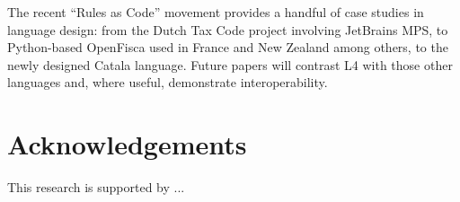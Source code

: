 \documentclass{IOS-Book-Article}
\begin{document}
The recent ``Rules as Code'' movement provides a handful of case studies in language design: from the Dutch Tax Code project involving JetBrains MPS, to Python-based OpenFisca used in France and New Zealand among others, to the newly designed Catala language. Future papers will contrast L4 with those other languages and, where useful, demonstrate interoperability.

\section*{Acknowledgements}

This research is supported by ... \citep{hankeknees}



\end{document}
